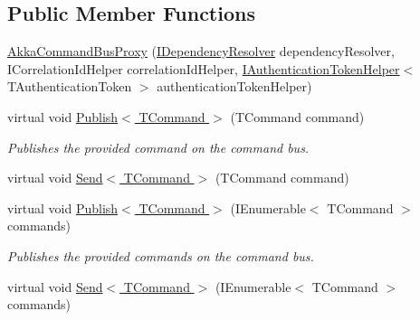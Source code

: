 \subsection*{Public Member Functions}
\begin{DoxyCompactItemize}
\item 
\hyperlink{classCqrs_1_1Akka_1_1Commands_1_1AkkaCommandBusProxy_ad9a3fa7aa546bc2c398d4f52d0659656_ad9a3fa7aa546bc2c398d4f52d0659656}{Akka\+Command\+Bus\+Proxy} (\hyperlink{interfaceCqrs_1_1Configuration_1_1IDependencyResolver}{I\+Dependency\+Resolver} dependency\+Resolver, I\+Correlation\+Id\+Helper correlation\+Id\+Helper, \hyperlink{interfaceCqrs_1_1Authentication_1_1IAuthenticationTokenHelper}{I\+Authentication\+Token\+Helper}$<$ T\+Authentication\+Token $>$ authentication\+Token\+Helper)
\item 
virtual void \hyperlink{classCqrs_1_1Akka_1_1Commands_1_1AkkaCommandBusProxy_a410c0fe52016d04de950b1ae767d2ccb_a410c0fe52016d04de950b1ae767d2ccb}{Publish$<$ T\+Command $>$} (T\+Command command)
\begin{DoxyCompactList}\small\item\em Publishes the provided {\itshape command}  on the command bus. \end{DoxyCompactList}\item 
virtual void \hyperlink{classCqrs_1_1Akka_1_1Commands_1_1AkkaCommandBusProxy_a15945f41b7439e722f5608f48b63c6d9_a15945f41b7439e722f5608f48b63c6d9}{Send$<$ T\+Command $>$} (T\+Command command)
\item 
virtual void \hyperlink{classCqrs_1_1Akka_1_1Commands_1_1AkkaCommandBusProxy_a81dc8162ca933d84b6aee04aff589010_a81dc8162ca933d84b6aee04aff589010}{Publish$<$ T\+Command $>$} (I\+Enumerable$<$ T\+Command $>$ commands)
\begin{DoxyCompactList}\small\item\em Publishes the provided {\itshape commands}  on the command bus. \end{DoxyCompactList}\item 
virtual void \hyperlink{classCqrs_1_1Akka_1_1Commands_1_1AkkaCommandBusProxy_a30115e2f8c964967aa8fe94712ece7c2_a30115e2f8c964967aa8fe94712ece7c2}{Send$<$ T\+Command $>$} (I\+Enumerable$<$ T\+Command $>$ commands)
\end{DoxyCompactItemize}
